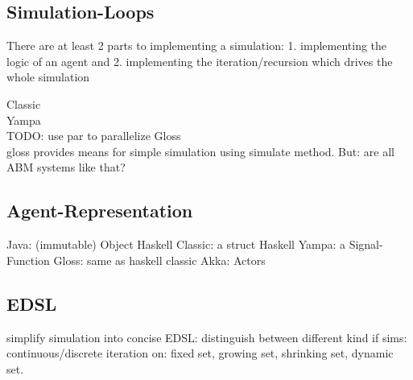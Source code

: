 \subsection{Simulation-Loops}
There are at least 2 parts to implementing a simulation: 1. implementing the logic of an agent and 2. implementing the iteration/recursion which drives the whole simulation

Classic \\
Yampa \\ TODO: use par to parallelize
Gloss \\
gloss provides means for simple simulation using simulate method. But: are all ABM systems like that?

\subsection{Agent-Representation}
Java: (immutable) Object
Haskell Classic: a struct
Haskell Yampa: a Signal-Function
Gloss: same as haskell classic
Akka: Actors

\subsection{EDSL}
simplify simulation into concise EDSL: distinguish between different kind if sims: continuous/discrete iteration on: fixed set, growing set, shrinking set, dynamic set. 